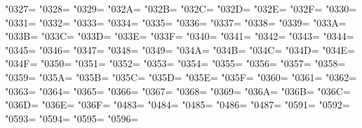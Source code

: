 \XeTeXcharclass"0327=\KclassCM
\XeTeXcharclass"0328=\KclassCM
\XeTeXcharclass"0329=\KclassCM
\XeTeXcharclass"032A=\KclassCM
\XeTeXcharclass"032B=\KclassCM
\XeTeXcharclass"032C=\KclassCM
\XeTeXcharclass"032D=\KclassCM
\XeTeXcharclass"032E=\KclassCM
\XeTeXcharclass"032F=\KclassCM
\XeTeXcharclass"0330=\KclassCM
\XeTeXcharclass"0331=\KclassCM
\XeTeXcharclass"0332=\KclassCM
\XeTeXcharclass"0333=\KclassCM
\XeTeXcharclass"0334=\KclassCM
\XeTeXcharclass"0335=\KclassCM
\XeTeXcharclass"0336=\KclassCM
\XeTeXcharclass"0337=\KclassCM
\XeTeXcharclass"0338=\KclassCM
\XeTeXcharclass"0339=\KclassCM
\XeTeXcharclass"033A=\KclassCM
\XeTeXcharclass"033B=\KclassCM
\XeTeXcharclass"033C=\KclassCM
\XeTeXcharclass"033D=\KclassCM
\XeTeXcharclass"033E=\KclassCM
\XeTeXcharclass"033F=\KclassCM
\XeTeXcharclass"0340=\KclassCM
\XeTeXcharclass"0341=\KclassCM
\XeTeXcharclass"0342=\KclassCM
\XeTeXcharclass"0343=\KclassCM
\XeTeXcharclass"0344=\KclassCM
\XeTeXcharclass"0345=\KclassCM
\XeTeXcharclass"0346=\KclassCM
\XeTeXcharclass"0347=\KclassCM
\XeTeXcharclass"0348=\KclassCM
\XeTeXcharclass"0349=\KclassCM
\XeTeXcharclass"034A=\KclassCM
\XeTeXcharclass"034B=\KclassCM
\XeTeXcharclass"034C=\KclassCM
\XeTeXcharclass"034D=\KclassCM
\XeTeXcharclass"034E=\KclassCM
\XeTeXcharclass"034F=\KclassCM
\XeTeXcharclass"0350=\KclassCM
\XeTeXcharclass"0351=\KclassCM
\XeTeXcharclass"0352=\KclassCM
\XeTeXcharclass"0353=\KclassCM
\XeTeXcharclass"0354=\KclassCM
\XeTeXcharclass"0355=\KclassCM
\XeTeXcharclass"0356=\KclassCM
\XeTeXcharclass"0357=\KclassCM
\XeTeXcharclass"0358=\KclassCM
\XeTeXcharclass"0359=\KclassCM
\XeTeXcharclass"035A=\KclassCM
\XeTeXcharclass"035B=\KclassCM
\XeTeXcharclass"035C=\KclassCM
\XeTeXcharclass"035D=\KclassCM
\XeTeXcharclass"035E=\KclassCM
\XeTeXcharclass"035F=\KclassCM
\XeTeXcharclass"0360=\KclassCM
\XeTeXcharclass"0361=\KclassCM
\XeTeXcharclass"0362=\KclassCM
\XeTeXcharclass"0363=\KclassCM
\XeTeXcharclass"0364=\KclassCM
\XeTeXcharclass"0365=\KclassCM
\XeTeXcharclass"0366=\KclassCM
\XeTeXcharclass"0367=\KclassCM
\XeTeXcharclass"0368=\KclassCM
\XeTeXcharclass"0369=\KclassCM
\XeTeXcharclass"036A=\KclassCM
\XeTeXcharclass"036B=\KclassCM
\XeTeXcharclass"036C=\KclassCM
\XeTeXcharclass"036D=\KclassCM
\XeTeXcharclass"036E=\KclassCM
\XeTeXcharclass"036F=\KclassCM
\XeTeXcharclass"0483=\KclassCM
\XeTeXcharclass"0484=\KclassCM
\XeTeXcharclass"0485=\KclassCM
\XeTeXcharclass"0486=\KclassCM
\XeTeXcharclass"0487=\KclassCM
\XeTeXcharclass"0591=\KclassCM
\XeTeXcharclass"0592=\KclassCM
\XeTeXcharclass"0593=\KclassCM
\XeTeXcharclass"0594=\KclassCM
\XeTeXcharclass"0595=\KclassCM
\XeTeXcharclass"0596=\KclassCM
